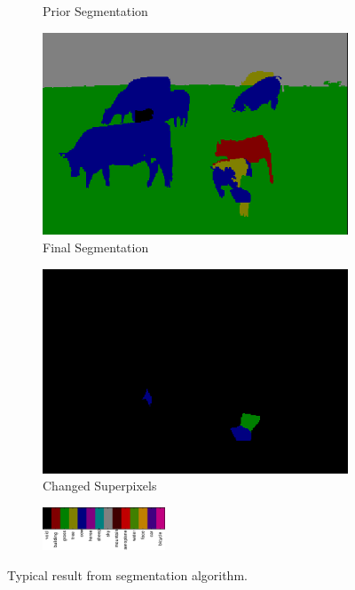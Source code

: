 \documentclass{article} %
\begin{document}
\begin{figure}[htb]
\begin{subfigure}[t]{0.19\textwidth}
		\parbox{0.95\textwidth}{\caption{Prior Segmentation \label{fig:prior_good}}}
	\end{subfigure}
	\begin{subfigure}[t]{0.19\textwidth}
		\centering
		\includegraphics[width = \textwidth]{./img/1_11_s_final.png}
		\parbox{0.95\textwidth}{\caption{Final Segmentation \label{fig:final_good}}}
	\end{subfigure}
	\begin{subfigure}[t]{0.19\textwidth}
		\centering
		\includegraphics[width = \textwidth]{./img/1_11_s_changed.png}
		\parbox{0.95\textwidth}{\caption{Changed Superpixels \label{fig:changed_good}}}
	\end{subfigure}

	\begin{subfigure}[t]{\textwidth}
		\centering
		\includegraphics[width = 0.4\textwidth]{./img/legend-rot.png}
	\end{subfigure}
	\caption{Typical result from segmentation algorithm.}
	\label{fig:result_good}
\end{figure}
\end{document}
